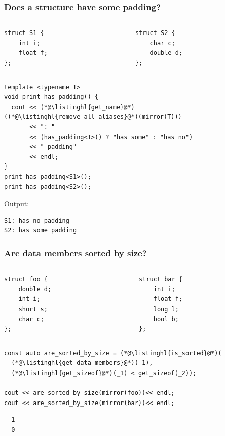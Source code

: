 \documentclass[compress,table,xcolor=table]{beamer}
\begin{document}
\begin{frame}[fragile]
  \frametitle{Does a structure have some padding?}
  \begin{columns}
    \begin{column}{.50\textwidth}
      \begin{lstlisting}[language=c++2x,basicstyle=\footnotesize\ttfamily]
struct S1 {
    int i;
    float f;
};
      \end{lstlisting}
    \end{column}
    \begin{column}{.40\textwidth}
      \begin{lstlisting}[language=c++2x,basicstyle=\footnotesize\ttfamily]
struct S2 {
    char c;
    double d;
};
      \end{lstlisting}
    \end{column}
  \end{columns}
  \begin{lstlisting}[language=c++2x,basicstyle=\scriptsize\ttfamily]
template <typename T>
void print_has_padding() {
  cout << (*@\listinghl{get_name}@*)((*@\listinghl{remove_all_aliases}@*)(mirror(T)))
       << ": "
       << (has_padding<T>() ? "has some" : "has no")
       << " padding"
       << endl;
}
print_has_padding<S1>();
print_has_padding<S2>();
  \end{lstlisting}
  Output:
  \begin{verbatim}
S1: has no padding
S2: has some padding
  \end{verbatim}
\end{frame}
\begin{frame}[fragile]
  \frametitle{Are data members sorted by size?}
  \begin{columns}
    \begin{column}{.45\textwidth}
      \begin{lstlisting}[language=c++2x,basicstyle=\small\ttfamily]
struct foo {
    double d;
    int i;
    short s;
    char c;
};
      \end{lstlisting}
    \end{column}
    \begin{column}{.45\textwidth}
      \begin{lstlisting}[language=c++2x,basicstyle=\small\ttfamily]
struct bar {
    int i;
    float f;
    long l;
    bool b;
};
      \end{lstlisting}
    \end{column}
  \end{columns}
  \begin{lstlisting}[language=c++2x,basicstyle=\small\ttfamily]
const auto are_sorted_by_size = (*@\listinghl{is_sorted}@*)(
  (*@\listinghl{get_data_members}@*)(_1),
  (*@\listinghl{get_sizeof}@*)(_1) < get_sizeof(_2));

cout << are_sorted_by_size(mirror(foo))<< endl;
cout << are_sorted_by_size(mirror(bar))<< endl;
  \end{lstlisting}
  \begin{verbatim}
  1
  0
  \end{verbatim}
\end{frame}
\end{document}
